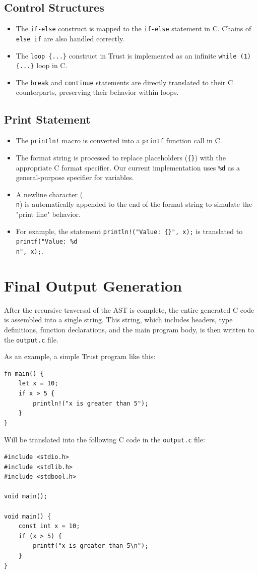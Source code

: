 \documentclass[12pt, a4paper]{report}
\begin{document}
\subsection{Control Structures}
\begin{itemize}
    \item The \texttt{if-else} construct is mapped to the \texttt{if-else} statement in C. Chains of \texttt{else if} are also handled correctly.
    \item The \texttt{loop \{...\}} construct in Trust is implemented as an infinite \texttt{while (1) \{...\}} loop in C.
    \item The \texttt{break} and \texttt{continue} statements are directly translated to their C counterparts, preserving their behavior within loops.
\end{itemize}

\subsection{Print Statement}
\begin{itemize}
    \item The \texttt{println!} macro is converted into a \texttt{printf} function call in C.
    \item The format string is processed to replace placeholders (\texttt{\{\}}) with the appropriate C format specifier. Our current implementation uses \texttt{\%d} as a general-purpose specifier for variables.
    \item A newline character (\texttt{\\n}) is automatically appended to the end of the format string to simulate the "print line" behavior.
    \item For example, the statement \texttt{println!("Value: \{\}", x);} is translated to \texttt{printf("Value: \%d\\n", x);}.
\end{itemize}

\section{Final Output Generation}
After the recursive traversal of the AST is complete, the entire generated C code is assembled into a single string. This string, which includes headers, type definitions, function declarations, and the main program body, is then written to the \texttt{output.c} file.

As an example, a simple Trust program like this:
\begin{verbatim}
fn main() {
    let x = 10;
    if x > 5 {
        println!("x is greater than 5");
    }
}
\end{verbatim}
Will be translated into the following C code in the \texttt{output.c} file:
\begin{verbatim}
#include <stdio.h>
#include <stdlib.h>
#include <stdbool.h>

void main();

void main() {
    const int x = 10;
    if (x > 5) {
        printf("x is greater than 5\n");
    }
}
\end{verbatim}
\end{document}
